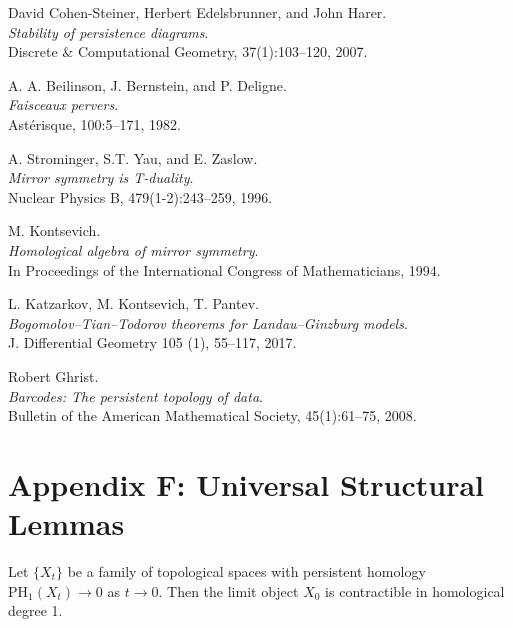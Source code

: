 \documentclass[11pt]{article}
\begin{document}
\begin{thebibliography}{9}

David Cohen-Steiner, Herbert Edelsbrunner, and John Harer.\\
\textit{Stability of persistence diagrams}.\\
Discrete \& Computational Geometry, 37(1):103--120, 2007.

A. A. Beilinson, J. Bernstein, and P. Deligne.\\
\textit{Faisceaux pervers}.\\
Astérisque, 100:5–171, 1982.

A. Strominger, S.T. Yau, and E. Zaslow.\\
\textit{Mirror symmetry is T-duality}.\\
Nuclear Physics B, 479(1-2):243–259, 1996.

M. Kontsevich.\\
\textit{Homological algebra of mirror symmetry}.\\
In Proceedings of the International Congress of Mathematicians, 1994.

L. Katzarkov, M. Kontsevich, T. Pantev.\\
\textit{Bogomolov–Tian–Todorov theorems for Landau–Ginzburg models}.\\
J. Differential Geometry 105 (1), 55–117, 2017.

Robert Ghrist.\\
\textit{Barcodes: The persistent topology of data}.\\
Bulletin of the American Mathematical Society, 45(1):61--75, 2008.

\end{thebibliography}

\section*{Appendix F: Universal Structural Lemmas}

\begin{lemma}
Let $\{X_t\}$ be a family of topological spaces with persistent homology $\mathrm{PH}_1(X_t) \to 0$ as $t \to 0$.  
Then the limit object $X_0$ is contractible in homological degree 1.
\end{lemma}
\end{document}
